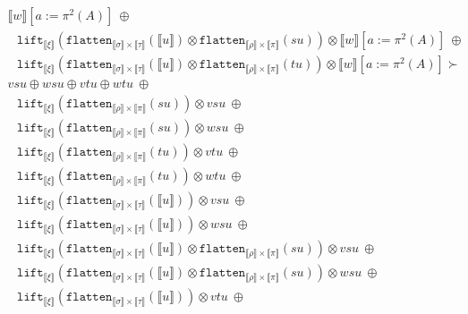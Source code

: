 \documentclass[runningheads,a4paper]{llncs}
\newcommand{\typeinterpret}[1]{\llbracket #1 \rrbracket}
\newcommand{\interpret}[1]{\llbracket #1 \rrbracket}
\newcommand{\flatten}{\mathtt{flatten}}
\newcommand{\lift}{\mathtt{lift}}
\begin{document}
\begin{itemize}
\[\begin{array}{l}
    \interpret{w}[a:=\pi^2(A)]
    \ \oplus \\
  \phantom{A}
    \lift_{\typeinterpret{\xi}}(\flatten_{\typeinterpret{\sigma} \times
    \typeinterpret{\tau}}(\interpret{u}) \otimes
    \flatten_{\typeinterpret{\rho} \times \typeinterpret{\pi}}(su))
    \otimes
    \interpret{w}[a:=\pi^2(A)]
    \ \oplus \\
  \phantom{A}
    \lift_{\typeinterpret{\xi}}(\flatten_{\typeinterpret{\sigma} \times
    \typeinterpret{\tau}}(\interpret{u}) \otimes
    \flatten_{\typeinterpret{\rho} \times \typeinterpret{\pi}}(tu))
    \otimes
    \interpret{w}[a:=\pi^2(A)] \succ \\
  vsu \oplus wsu \oplus
    vtu \oplus wtu\ \oplus \\
  \phantom{A}
    \lift_{\typeinterpret{\xi}}(\flatten_{\typeinterpret{\rho} \times
    \typeinterpret{\pi}}(su)) \otimes vsu\ \oplus \\
  \phantom{A}
    \lift_{\typeinterpret{\xi}}(\flatten_{\typeinterpret{\rho}
    \times \typeinterpret{\pi}}(su)) \otimes wsu\ \oplus \\
  \phantom{A}
    \lift_{\typeinterpret{\xi}}(\flatten_{\typeinterpret{\rho} \times
    \typeinterpret{\pi}}(tu)) \otimes vtu\ \oplus \\
  \phantom{A}
    \lift_{\typeinterpret{\xi}}(\flatten_{\typeinterpret{\rho}
    \times \typeinterpret{\pi}}(tu)) \otimes wtu\ \oplus \\
  \phantom{A}
    \lift_{\typeinterpret{\xi}}(\flatten_{\typeinterpret{\sigma}
    \times \typeinterpret{\tau}}(\interpret{u})) \otimes vsu\ \oplus \\
  \phantom{A}
    \lift_{\typeinterpret{\xi}}(\flatten_{\typeinterpret{\sigma}
    \times \typeinterpret{\tau}}(\interpret{u})) \otimes wsu\ \oplus \\
  \phantom{A}
    \lift_{\typeinterpret{\xi}}(\flatten_{\typeinterpret{\sigma}
    \times \typeinterpret{\tau}}(\interpret{u}) \otimes
    \flatten_{\typeinterpret{\rho} \times
    \typeinterpret{\pi}}(su)) \otimes vsu\ \oplus \\
  \phantom{A}
    \lift_{\typeinterpret{\xi}}(\flatten_{\typeinterpret{\sigma}
    \times \typeinterpret{\tau}}(\interpret{u}) \otimes
    \flatten_{\typeinterpret{\rho}
    \times \typeinterpret{\pi}}(su)) \otimes wsu\ \oplus \\
  \phantom{A}
    \lift_{\typeinterpret{\xi}}(\flatten_{\typeinterpret{\sigma}
    \times \typeinterpret{\tau}}(\interpret{u})) \otimes vtu\ \oplus \\
  \phantom{A}

\end{array}\]
\end{itemize}
\end{document}
